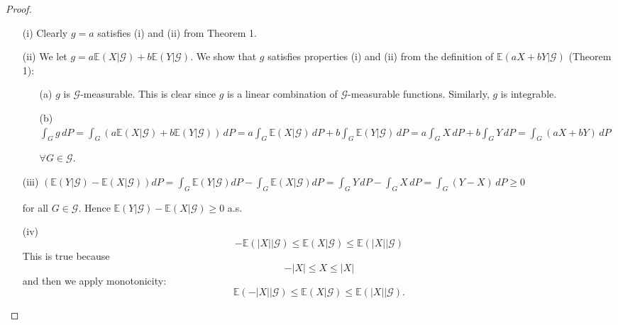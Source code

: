 \begin{proof}
    \begin{itemize}
    \item[(i)] Clearly \( g = a \) satisfies (i) and (ii) from Theorem 1.
    
    \item[(ii)] We let \( g = a \mathbb{E}(X|\mathcal{G}) + b \mathbb{E}(Y|\mathcal{G}) \). We show that \( g \) satisfies properties (i) and (ii) from the definition of \(\mathbb{E}(aX + bY|\mathcal{G})\) (Theorem 1):
    \begin{itemize}
        \item[(a)] \( g \) is \(\mathcal{G}\)-measurable. This is clear since \( g \) is a linear combination of \(\mathcal{G}\)-measurable functions. Similarly, \( g \) is integrable.
        \item[(b)] \(\int_G g \, dP = \int_G (a \mathbb{E}(X|\mathcal{G}) + b \mathbb{E}(Y|\mathcal{G})) \, dP = a \int_G \mathbb{E}(X|\mathcal{G}) \, dP + b \int_G \mathbb{E}(Y|\mathcal{G}) \, dP = a \int_G X \, dP + b \int_G Y \, dP = \int_G (aX + bY) \, dP\)
        
        \(\forall G \in \mathcal{G}\).
    \end{itemize}
    
    \item[(iii)] \( \left( \mathbb{E}(Y|\mathcal{G}) - \mathbb{E}(X|\mathcal{G}) \right) dP = \int_G \mathbb{E}(Y|\mathcal{G}) dP - \int_G \mathbb{E}(X|\mathcal{G}) dP = \int_G Y \, dP - \int_G X \, dP = \int_G (Y - X) \, dP \geq 0 \)
    
    for all \( G \in \mathcal{G} \). Hence \( \mathbb{E}(Y|\mathcal{G}) - \mathbb{E}(X|\mathcal{G}) \geq 0 \) a.s.

    \item[(iv)]
    \[
    -\mathbb{E}(|X| | \mathcal{G}) \leq \mathbb{E}(X | \mathcal{G}) \leq \mathbb{E}(|X| | \mathcal{G})
    \]
    This is true because
    \[
    -|X| \leq X \leq |X|
    \]
    and then we apply monotonicity:
    \[
    \mathbb{E}(-|X| | \mathcal{G}) \leq \mathbb{E}(X | \mathcal{G}) \leq \mathbb{E}(|X| | \mathcal{G}).
    \]
\end{itemize}
\end{proof}